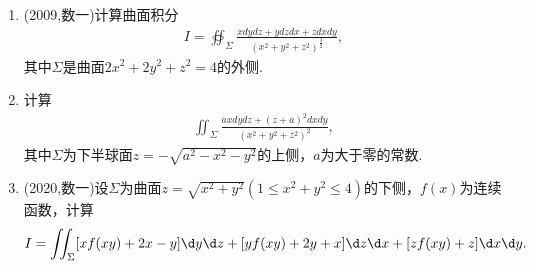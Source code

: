 \documentclass[12pt, a4paper, oneside, UTF8]{ctexbook}
\begin{document}
\begin{enumerate}[label=\arabic*.,start=8]
    \item (2009,数一)计算曲面积分
    \begin{align*}
    I=\oiint_{\Sigma}\frac{xdydz+ydzdx+zdxdy}{(x^2+y^2+z^2)^{\frac{3}{2}}},
    \end{align*}
    其中$\Sigma$是曲面$2x^2+2y^2+z^2=4$的外侧.
    
    \begin{solution}
    \newpage
    \end{solution}
    
    \item 计算
    \begin{align*}
    \iint_{\Sigma}\frac{axdydz+(z+a)^2dxdy}{(x^2+y^2+z^2)^2},
    \end{align*}
    其中$\Sigma$为下半球面$z=-\sqrt{a^2-x^2-y^2}$的上侧，$a$为大于零的常数.
    
    \begin{solution}
    \newpage
    \end{solution}
    
    \item (2020,数一)设$\Sigma$为曲面$z=\sqrt{x^2+y^2}(1\leq x^2+y^2\leq 4)$的下侧，$f(x)$为连续函数，计算
    \begin{align*}
    I=\iint_{\Sigma}[xf(xy)+2x-y]\d y\d z+[yf(xy)+2y+x]\d z\d x+[zf(xy)+z]\d x\d y.
    \end{align*}
    
    \begin{solution}
    \newpage
    \end{solution}
\end{enumerate}


\ifx\allfiles\undefined
\end{document}
